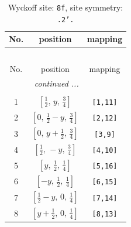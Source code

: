 \documentclass[fleqn,8pt]{jsarticle}
\begin{document}
\begin{longtable}{ccc}
\caption{Wyckoff site: {\tt 8f}, site symmetry: {\tt .2'.}}
 \\
 \hline \hline
No. & position & mapping \\ \hline \endfirsthead

\multicolumn{2}{l}{\tablename\ \thetable{}} \\
 \hline \hline
No. & position & mapping \\ \hline \endhead

 \hline \hline
\multicolumn{2}{r}{\footnotesize\it continued ...} \\ \endfoot

 \hline \hline
\multicolumn{2}{r}{} \\ \endlastfoot

1 & $\left[ \frac{1}{2},\, y,\, \frac{3}{4} \right]$ & {\tt [1,11]} \\ \hline
2 & $\left[ 0,\, \frac{1}{2} - y,\, \frac{3}{4} \right]$ & {\tt [2,12]} \\ \hline
3 & $\left[ 0,\, y + \frac{1}{2},\, \frac{3}{4} \right]$ & {\tt [3,9]} \\ \hline
4 & $\left[ \frac{1}{2},\, - y,\, \frac{3}{4} \right]$ & {\tt [4,10]} \\ \hline
5 & $\left[ y,\, \frac{1}{2},\, \frac{1}{4} \right]$ & {\tt [5,16]} \\ \hline
6 & $\left[ - y,\, \frac{1}{2},\, \frac{1}{4} \right]$ & {\tt [6,15]} \\ \hline
7 & $\left[ \frac{1}{2} - y,\, 0,\, \frac{1}{4} \right]$ & {\tt [7,14]} \\ \hline
8 & $\left[ y + \frac{1}{2},\, 0,\, \frac{1}{4} \right]$ & {\tt [8,13]} \\
\end{longtable}
\renewcommand{\arraystretch}{1.2}
\end{document}
